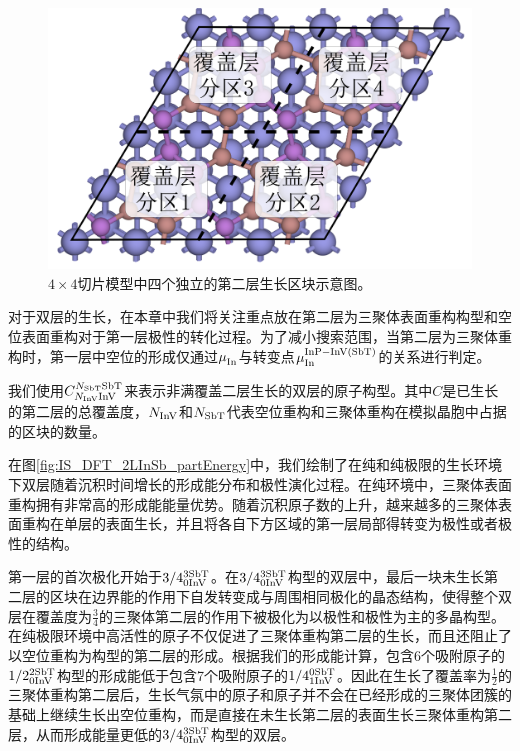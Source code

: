 \begin{figure}[htb]
    \includegraphics{pic/IS_diagram_2Linsb_partial.png}
    \caption{$4 \times 4$切片模型中四个独立的第二层生长区块示意图。}
    \label{fig:IS_diagram_2Linsb_partial}
\end{figure}

对于双层的生长，在本章中我们将关注重点放在第二层为三聚体表面重构构型和空位表面重构对于第一层极性的转化过程。为了减小搜索范围，当第二层为三聚体重构时，第一层中空位的形成仅通过$\it \mu_{\rm In}^{\rm } \it$与转变点$\it \mu_{\rm In}^{\rm InP-InV\left(SbT\right)} \it$的关系进行判定。

我们使用$C_{N_{\rm InV}\rm InV}^{N_{\rm SbT}\rm SbT}$来表示非满覆盖二层生长的双层的原子构型。其中$C$是已生长的第二层的总覆盖度，$N_{\rm InV}$和$N_{\rm SbT}$代表空位重构和三聚体重构在模拟晶胞中占据的区块的数量。

在图\ref{fig:IS_DFT_2LInSb_partEnergy}中，我们绘制了在纯和纯极限的生长环境下双层随着沉积时间增长的形成能分布和极性演化过程。在纯环境中，三聚体表面重构拥有非常高的形成能能量优势。随着沉积原子数的上升，越来越多的三聚体表面重构在单层的表面生长，并且将各自下方区域的第一层局部得转变为极性或者极性的结构。

第一层的首次极化开始于$\rm 3/4{}_{0InV}^{3SbT} \it$。在$\rm 3/4{}_{0InV}^{3SbT} \it$构型的双层中，最后一块未生长第二层的区块在边界能的作用下自发转变成与周围相同极化的晶态结构，使得整个双层在覆盖度为$\frac{3}{4}$的三聚体第二层的作用下被极化为以极性和极性为主的多晶构型。在纯极限环境中高活性的原子不仅促进了三聚体重构第二层的生长，而且还阻止了以空位重构为构型的第二层的形成。根据我们的形成能计算，包含6个吸附原子的$\rm 1/2{}_{0InV}^{2SbT} \it$构型的形成能低于包含7个吸附原子的$\rm 1/4{}_{1InV}^{0SbT} \it$。因此在生长了覆盖率为$\frac{1}{2}$的三聚体重构第二层后，生长气氛中的原子和原子并不会在已经形成的三聚体团簇的基础上继续生长出空位重构，而是直接在未生长第二层的表面生长三聚体重构第二层，从而形成能量更低的$\rm 3/4{}_{0InV}^{3SbT} \it$构型的双层。


